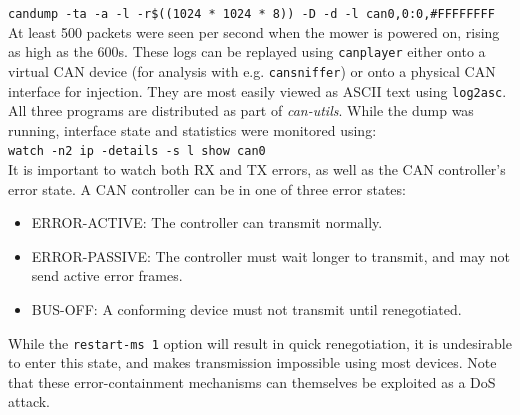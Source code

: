 \documentclass[letterpaper,10pt]{article}
\begin{document}
\texttt{candump -ta -a -l -r\$((1024 * 1024 * 8)) -D -d -l can0,0:0,\#FFFFFFFF}\\

At least 500 packets were seen per second when the mower is powered on, rising
as high as the 600s. These logs can be replayed using \texttt{canplayer} either
onto a virtual CAN device (for analysis with e.g. \texttt{cansniffer}) or onto
a physical CAN interface for injection. They are most easily viewed as ASCII
text using \texttt{log2asc}. All three programs are distributed as part of
\textit{can-utils}. While the dump was running, interface state and statistics
were monitored using:\\

\texttt{watch -n2 ip -details -s l show can0}\\

It is important to watch both RX and TX errors, as well as the CAN controller's
error state\cite{canerrors}. A CAN controller can be in one of three error
states:
\begin{itemize}
\item ERROR-ACTIVE: The controller can transmit normally.
\item ERROR-PASSIVE: The controller must wait longer to transmit, and may not
  send active error frames.
\item BUS-OFF: A conforming device must not transmit until renegotiated.
\end{itemize}
While the \texttt{restart-ms 1} option will result in quick renegotiation, it
is undesirable to enter this state, and makes transmission impossible using most
devices. Note that these error-containment mechanisms can themselves be
exploited as a DoS attack\parencite{errorvulns}.
\end{document}
